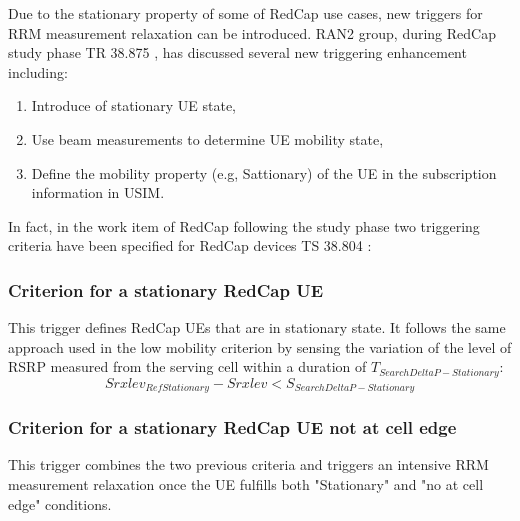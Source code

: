 \documentclass[conference]{IEEEtran}
\begin{document}
Due to the stationary property of some of RedCap use cases, new triggers for RRM measurement relaxation can be introduced. RAN2 group, during RedCap study phase TR 38.875 \cite{3gpp.38.875}, has discussed several new triggering enhancement including:
\begin{enumerate}
    \item Introduce of stationary UE state,
    \item Use beam measurements to determine UE mobility state,
    \item Define the mobility property (e.g, Sattionary) of the UE in the subscription information in USIM.
\end{enumerate}

In fact, in the work item \cite{3gpp_revised_2022-1_RP-220966}  of RedCap following the study phase two triggering criteria have been specified for RedCap devices TS 38.804 \cite{3gpp_study_nodate-4_38.804}:
\subsubsection*{\textbf{Criterion for a stationary RedCap UE}} This trigger defines RedCap UEs that are in stationary state. It follows the same approach used in the low mobility criterion by sensing the variation of the level of RSRP measured from the serving cell within a duration of $T_{SearchDeltaP-Stationary}$:
\begin{equation}
Srxlev_{RefStationary}-Srxlev<S_{SearchDeltaP-Stationary}
\label{equ:low-mobility-criterion}
\end{equation}


\subsubsection*{\textbf{Criterion for a stationary RedCap UE not at cell edge}} This trigger combines the two previous criteria and triggers an intensive RRM measurement relaxation once the UE fulfills both "Stationary" and "no at cell edge" conditions. 


\end{document}
